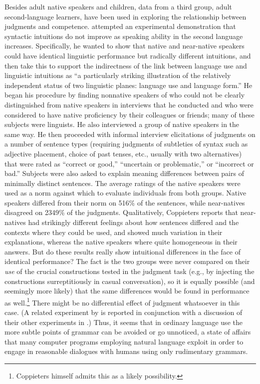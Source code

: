 Besides adult native speakers and children, data from a third group, adult second-language learners, have been used in exploring the relationship between judgments and competence. \citet{Coppieters1987} attempted an experimental demonstration that syntactic intuitions do not improve as speaking ability in the second language increases. Specifically, he wanted to show that native and near-native speakers could have identical linguistic performance but radically different intuitions, and then take this to support the indirectness of the link between language use and linguistic intuitions as ``a particularly striking illustration of the relatively independent status of two linguistic planes: language use and language form.'' He began his procedure by finding nonnative speakers of  who could not be clearly distinguished from native speakers in interviews that he conducted and who were considered to have native proficiency by their colleagues or friends; many of these subjects were linguists. He also interviewed a group of native speakers in the same way. He then proceeded with informal interview elicitations of judgments on a number of sentence types (requiring judgments of subtleties of  syntax such as adjective placement, choice of past tenses, etc., usually with two alternatives) that were rated as ``correct or good,'' ``uncertain or problematic,'' or ``incorrect or bad.'' Subjects were also asked to explain meaning differences between pairs of minimally distinct sentences. The average ratings of the native speakers were used as a norm against which to evaluate individuals from both groups. Native speakers differed from their norm on 5\textendash{}16\% of the sentences,
while near-natives disagreed on 23\textendash{}49\% of the judgments. Qualitatively, Coppieters reports that near-natives had strikingly different feelings about how sentences differed and the contexts where they could be used, and showed much variation in their explanations, whereas the native speakers where quite homogeneous in their answers. But do these results  really show intuitional  differences in the face of identical performance? The fact is the two groups were never compared on their \textit{use} of the crucial constructions tested in the judgment task (e.g., by injecting the constructions surreptitiously in casual conversation),  so it is equally possible (and seemingly more likely) that the same differences would be found in performance as well.\footnote{Coppieters himself admits this as a likely possibility.}
 There might be no differential effect of judgment whatsoever in this case. (A related experiment by \citet{SnowEtAl1977} is reported in conjunction with a discussion of their other experiments in .) Thus, it seems that in ordinary language use the more subtle points of grammar can be avoided or go unnoticed, a state of affairs that many computer programs employing natural language exploit in order to engage in reasonable dialogues with humans using only rudimentary  grammars.

